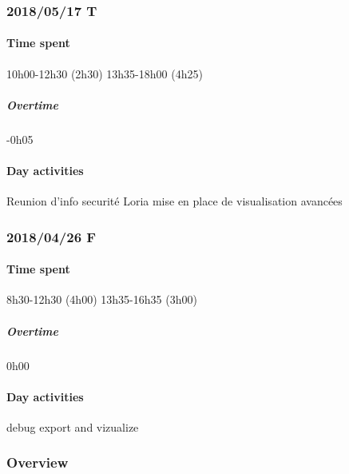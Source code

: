 \subsubsection{2018/05/17 T}
\paragraph{Time spent}
{10h00}-{12h30} (2h30)
{13h35}-{18h00} (4h25) 

\subparagraph{Overtime}
-0h05

\paragraph{Day activities}
Reunion d'info securité Loria
mise en place de visualisation avancées

\subsubsection{2018/04/26 F}
\paragraph{Time spent}
{8h30}-{12h30} (4h00)
{13h35}-{16h35} (3h00) 

\subparagraph{Overtime}
0h00

\paragraph{Day activities}
debug export and vizualize

\subsubsection{Overview}
